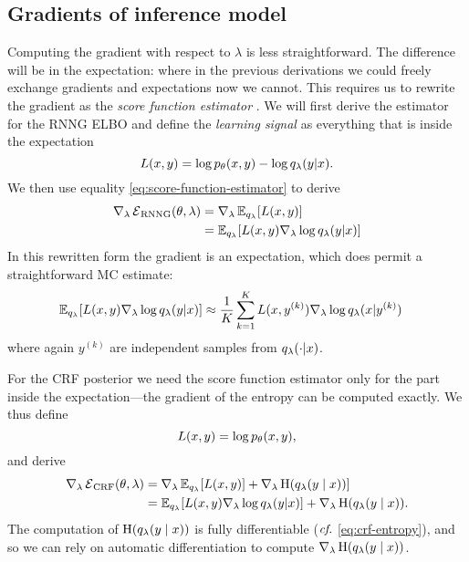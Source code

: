   \subsection{Gradients of inference model}
    Computing the gradient with respect to $\lambda$ is less straightforward. The difference will be in the expectation: where in the previous derivations we could freely exchange gradients and expectations now we cannot. This requires us to rewrite the gradient as the \textit{score function estimator} \citep{fu2006gradient}.  We will first derive the estimator for the RNNG ELBO and define the \textit{learning signal} as everything that is inside the expectation
    \begin{equation}
      L(x, y) = \log p_{\theta}(x, y) - \log q_{\lambda}(y | x).
    \end{equation}
    We then use equality \ref{eq:score-function-estimator} to derive
    \begin{align}
      \nabla_{\lambda} \operatorname{\mathcal{E}}_{\text{RNNG}}(\theta, \lambda)
        &= \nabla_{\lambda} \operatorname{\mathbb{E}}_{q_{\lambda}} [ L(x, y) ]  \nonumber \\
        &= \operatorname{\mathbb{E}}_{q_{\lambda}} [ L(x, y) \nabla_{\lambda} \log q_{\lambda}(y | x) ]
    \end{align}
    In this rewritten form the gradient is an expectation, which does permit a straightforward MC estimate:
    \begin{align}
      \operatorname{\mathbb{E}}_{q_{\lambda}} [ L(x, y) \nabla_{\lambda} \log q_{\lambda}(y | x) ]
        &\approx \frac{1}{K}\sum_{k=1}^K  L(x, y^{(k)})\nabla_{\lambda} \log q_{\lambda}(x | y^{(k)})
    \end{align}
    where again $y^{(k)}$ are independent samples from $q_{\lambda}(\cdot | x)$.

    For the CRF posterior we need the score function estimator only for the part inside the expectation---the gradient of the entropy can be computed exactly. We thus define
    \begin{equation}
      L(x, y) = \log p_{\theta}(x, y),
    \end{equation}
    and derive
    \begin{align}
      \nabla_{\lambda} \operatorname{\mathcal{E}}_{\text{CRF}}(\theta, \lambda)
        &= \nabla_{\lambda} \operatorname{\mathbb{E}}_{q_{\lambda}} [ L(x, y) ] +  \nabla_{\lambda} \operatorname{H}(q_{\lambda}(y \mid x)) ] \nonumber  \\
        &= \operatorname{\mathbb{E}}_{q_{\lambda}} [ L(x, y) \nabla_{\lambda} \log q_{\lambda}(y | x) ] + \nabla_{\lambda} \operatorname{H}(q_{\lambda}(y \mid x)).
    \end{align}
    The computation of $\operatorname{H}(q_{\lambda}(y \mid x))$ is fully differentiable ($\emph{cf.}$ \ref{eq:crf-entropy}), and so we can rely on automatic differentiation to compute $\nabla_{\lambda} \operatorname{H}(q_{\lambda}(y \mid x))$.

